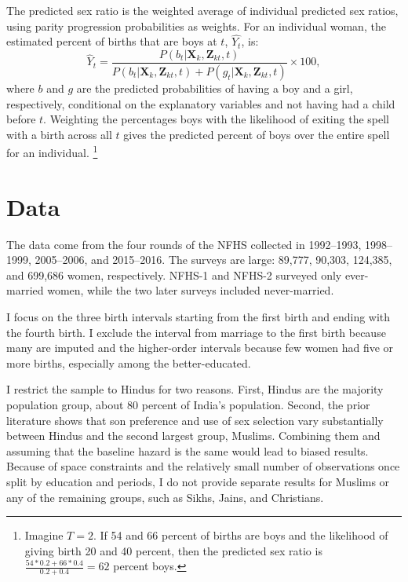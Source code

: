 \documentclass[12pt,letterpaper]{article}
\begin{document}
The predicted sex ratio is the weighted average of individual predicted sex ratios, using 
parity progression probabilities as weights.
For an individual woman, the estimated percent of births that are boys at $t$, $\hat{Y_t}$, is:  
\begin{equation}
\hat{Y}_t 
= 
\frac{ P(b_{t} | \mathbf{X}_{k}, \mathbf{Z}_{kt},t )}
{ P(b_{t} | \mathbf{X}_{k}, \mathbf{Z}_{kt},t) + P(g_{t} | \mathbf{X}_{k}, \mathbf{Z}_{kt},t )} 
\times 100,
\label{eq:probability_son}
\end{equation}
where $b$ and $g$ are the predicted probabilities of having a boy and a girl, respectively,
conditional on the explanatory variables and not having had a child before $t$.
Weighting the percentages boys with the likelihood of exiting the spell with a birth across all 
$t$ gives the predicted percent of boys over the entire spell for an individual.%
\footnote{
Imagine $T=2$. 
If 54 and 66 percent of births are boys and the likelihood of giving birth 20 and 40 percent, 
then the predicted sex ratio is $\frac{54*0.2+66*0.4}{0.2+0.4} = 62$ percent boys. 
}


\section{Data\label{sec:data}}

The data come from the four rounds of the NFHS
collected in 1992--1993, 1998--1999, 2005--2006, and 2015--2016.
The surveys are large: 89,777, 90,303, 124,385, and 699,686 women, respectively. 
NFHS-1 and NFHS-2 surveyed only ever-married women, while the two later surveys included 
never-married.

I focus on the three birth intervals starting from the first birth and ending with the 
fourth birth.
I exclude the interval from marriage to the first birth because many are imputed and the
higher-order intervals because few women had five or more births, especially among the 
better-educated.

I restrict the sample to Hindus for two reasons.
First, Hindus are the majority population group, about 80 percent of India’s population.
Second, the prior literature shows that son preference and use of sex selection vary 
substantially between Hindus and the second largest group, Muslims. 
Combining them and assuming that the baseline hazard is the same would lead to biased 
results.
Because of space constraints and the relatively small number of observations once split 
by education and periods, I do not provide separate results for Muslims or any of the 
remaining groups, such as Sikhs, Jains, and Christians.
\end{document}
